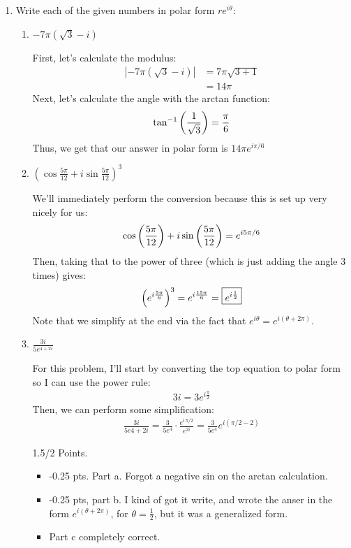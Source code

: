\begin{enumerate}
	\item Write each of the given numbers in polar form $re^{i\theta}$:
	\begin{enumerate}
		\item $-7\pi(\sqrt{3}-i)$
		\begin{problem}
			First, let's calculate the modulus:
			\begin{align*}
				|-7\pi(\sqrt{3}-i)| &= 7\pi\sqrt{3 + 1}\\
				&= 14\pi
			\end{align*}
			Next, let's calculate the angle with the arctan function:
			\begin{align*}
				\tan^{-1}\left(\frac{1}{\sqrt 3}\right)=\frac{\pi}6
			\end{align*}
			Thus, we get that our answer in polar form is $14\pi e^{i\pi/6}$
		\end{problem}
		\item $\left(\cos \frac{5\pi}{12} + i \sin \frac{5\pi}{12} \right)^3$
		\begin{problem}
			We'll immediately perform the conversion because this is set up very nicely for us:
			\begin{align*}
				\cos\left(\frac{5\pi}{12}\right)+i\sin\left(\frac{5\pi}{12}\right) = e^{i5\pi/6}
			\end{align*}
			Then, taking that to the power of three (which is just adding the angle 3 times) gives:
			\begin{align*}
				\left(e^{i\frac{5\pi}6}\right)^3 = e^{i\frac{15\pi}6}=\boxed{e^{i\frac{1}2}}
			\end{align*}
			Note that we simplify at the end via the fact that $e^{i\theta} = e^{i(\theta + 2\pi)}$. 
		\end{problem}
		\item $\frac{3i}{5e^{4+2i}}$
		\begin{problem}
			For this problem, I'll start by converting the top equation to polar form so I can use the power rule:
			\begin{align*}
				3i = 3e^{i\frac{\pi}2}
			\end{align*}
			Then, we can perform some simplification:
			\begin{align*}
				\frac{3i}{5e{4+2i}}=\frac{3}{5e^4}\cdot\frac{e^{i\,\pi/2}}{e^{2i}} = \frac{3}{5e^4}e^{i(\pi/2-2)}
			\end{align*}
		\end{problem}
		\begin{grade}
			1.5/2 Points. 
			\begin{itemize}
				\item -0.25 pts. Part a. Forgot a negative sin on the arctan calculation. 
				\item -0.25 pts, part b. I kind of got it write, and wrote the anser in the form $e^{i(\theta + 2\pi)}$, for $\theta = \frac{1}2$, but it was a generalized form. 
				\item Part c completely correct. 
			\end{itemize}
		\end{grade}
	\end{enumerate}
	

\end{enumerate}
